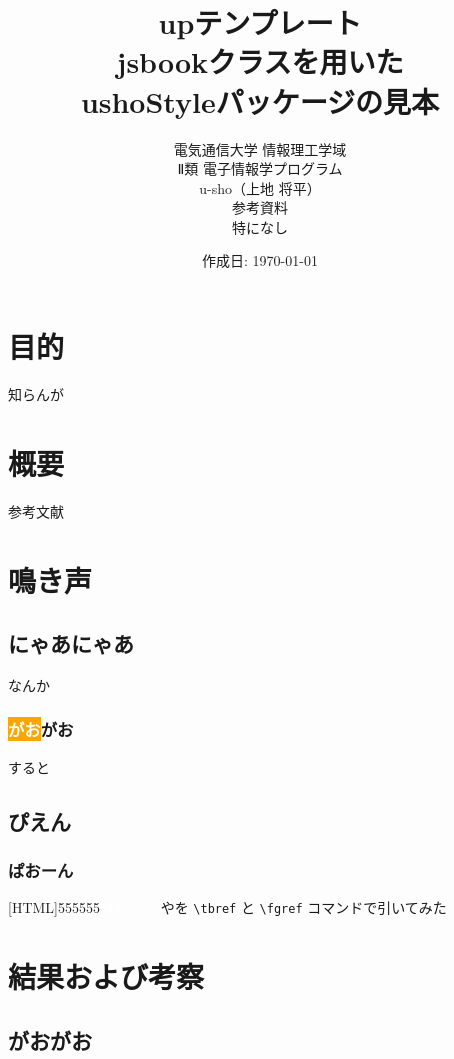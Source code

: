 \documentclass[uplatex,dvipdfmx,11pt]{jsbook}
\title{
  {\normalsize up\LaTeXe テンプレート}%
  \\[10truemm]
  jsbookクラスを用いた\\
  ushoStyleパッケージの見本
  \vspace{30truemm}
}
\author{
  \large{電気通信大学 情報理工学域}\\
  \large{Ⅱ類 電子情報学プログラム}
  \\[10truemm]
  u-sho（上地 将平）
  \\[20truemm]
  参考資料
  \\[5truemm]
  特になし
  \vspace{20truemm}
}
\date{作成日: \和暦\today}
\begin{document}
  \maketitle
  \tableofcontents

  \chapter{目的}%
    知らんが

  \chapter{概要}%
    参考文献~\cite{キー1}

  \chapter{鳴き声} %

    \section{にゃあにゃあ}
      なんか

      \subsection{\colorbox{orange}{\textcolor{white}{がお}}がお}
        すると

    \section{ぴえん} %

      \subsection{ぱおーん}

        [HTML]{555555}{\textcolor{white}{ぱおーん}}
        やを \verb|\tbref| と \verb|\fgref| コマンドで引いてみた

  \newpage

  \chapter{結果および考察}

    \section{がおがお}
\end{document}
